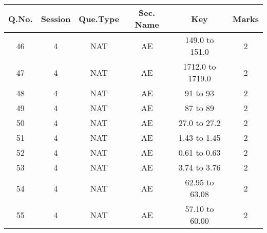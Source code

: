 \begin{tabular}[12pt]{ |c| c| c| c| c| c| }
    \hline
   Q.No. & Session & Que.Type & Sec. Name & Key & Marks \\
    \hline
    46 & 4 & NAT & AE & 149.0 to 151.0 & 2\\
    \hline
    47 & 4 & NAT & AE & 1712.0 to 1719.0 & 2\\
    \hline
    48 & 4 & NAT & AE & 91 to 93 & 2\\
    \hline
    49 & 4 & NAT & AE & 87 to 89 & 2\\
    \hline
    50 & 4 & NAT & AE & 27.0 to 27.2 & 2\\
    \hline
    51 & 4 & NAT & AE & 1.43 to 1.45 & 2\\
    \hline
    52 & 4 & NAT & AE & 0.61 to 0.63 & 2\\
    \hline
    53 & 4 & NAT & AE & 3.74 to 3.76 & 2\\
    \hline
    54 & 4 & NAT & AE & 62.95 to 63.08 & 2\\
    \hline
    55 & 4 & NAT & AE & 57.10 to 60.00 & 2\\
    \hline
\end{tabular}
